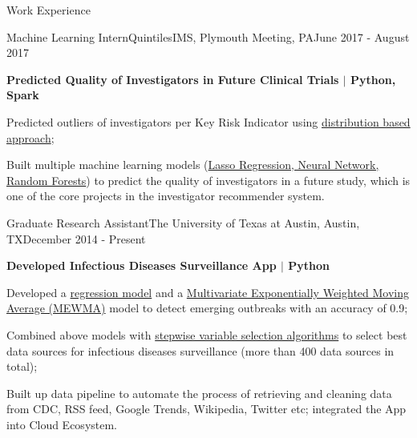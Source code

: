\documentclass{my_resume} %
\begin{document}
\begin{rSection}{Work Experience}

  \begin{rSubsection}{Machine Learning Intern}{QuintilesIMS, Plymouth Meeting,
    PA}{June 2017 - August 2017}

  \item[] \textbf{Predicted Quality of Investigators in Future Clinical Trials
    $|$ Python, Spark}
  \item Predicted outliers of investigators per Key Risk Indicator using
    \underline{distribution based approach};
  \item Built multiple machine learning models (\underline{Lasso Regression, Neural
    Network, Random Forests}) to predict the quality of investigators in a
    future study, which is one of the core projects in the investigator
    recommender system.
  \end{rSubsection}

  \begin{rSubsection}{Graduate Research Assistant}{The University of Texas at
    Austin, Austin, TX}{December 2014 - Present}

  \item[] \textbf{Developed Infectious Diseases Surveillance App $|$ Python}
  \item Developed a \underline{regression model} and a \underline{Multivariate
      Exponentially Weighted Moving Average (MEWMA)} model to detect emerging
      outbreaks with an accuracy of 0.9;
  \item Combined above models with \underline{stepwise variable selection
    algorithms} to select best data sources for infectious diseases
    surveillance (more than 400 data sources in total);
  \item Built up data pipeline to automate the process of retrieving and
    cleaning data from CDC, RSS feed, Google Trends, Wikipedia, Twitter etc;
    integrated the App into Cloud Ecosystem.


  \end{rSubsection}
\end{rSection}
\end{document}
